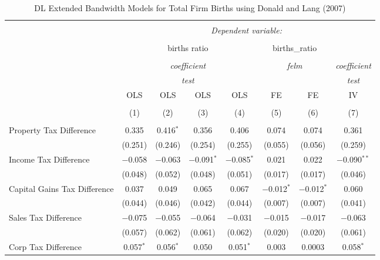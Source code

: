 
\begin{table}[!htbp] \centering 
  \caption{DL Extended Bandwidth Models for  Total Firm Births using Donald and Lang (2007)} 
  \label{} 
\begin{tabular}{@{\extracolsep{5pt}}lccccccc} 
\\[-1.8ex]\hline 
\hline \\[-1.8ex] 
 & \multicolumn{7}{c}{\textit{Dependent variable:}} \\ 
\cline{2-8} 
\\[-1.8ex] & \multicolumn{4}{c}{births ratio} & \multicolumn{2}{c}{births\_ratio} &   \\ 
\\[-1.8ex] & \multicolumn{4}{c}{\textit{coefficient}} & \multicolumn{2}{c}{\textit{felm}} & \textit{coefficient} \\ 
 & \multicolumn{4}{c}{\textit{test}} & \multicolumn{2}{c}{\textit{}} & \textit{test} \\ 
 & OLS & OLS & OLS & OLS & FE & FE & IV \\ 
\\[-1.8ex] & (1) & (2) & (3) & (4) & (5) & (6) & (7)\\ 
\hline \\[-1.8ex] 
 Property Tax Difference & 0.335 & 0.416$^{*}$ & 0.356 & 0.406 & 0.074 & 0.074 & 0.361 \\ 
  & (0.251) & (0.246) & (0.254) & (0.255) & (0.055) & (0.056) & (0.259) \\ 
  Income Tax Difference & $-$0.058 & $-$0.063 & $-$0.091$^{*}$ & $-$0.085$^{*}$ & 0.021 & 0.022 & $-$0.090$^{**}$ \\ 
  & (0.048) & (0.052) & (0.048) & (0.051) & (0.017) & (0.017) & (0.046) \\ 
  Capital Gains Tax Difference & 0.037 & 0.049 & 0.065 & 0.067 & $-$0.012$^{*}$ & $-$0.012$^{*}$ & 0.060 \\ 
  & (0.044) & (0.046) & (0.042) & (0.044) & (0.007) & (0.007) & (0.041) \\ 
  Sales Tax Difference & $-$0.075 & $-$0.055 & $-$0.064 & $-$0.031 & $-$0.015 & $-$0.017 & $-$0.063 \\ 
  & (0.057) & (0.062) & (0.061) & (0.062) & (0.020) & (0.020) & (0.061) \\ 
  Corp Tax Difference & 0.057$^{*}$ & 0.056$^{*}$ & 0.050 & 0.051$^{*}$ & 0.003 & 0.0003 & 0.058$^{*}$ \\ 

\end{tabular}
\end{table}
